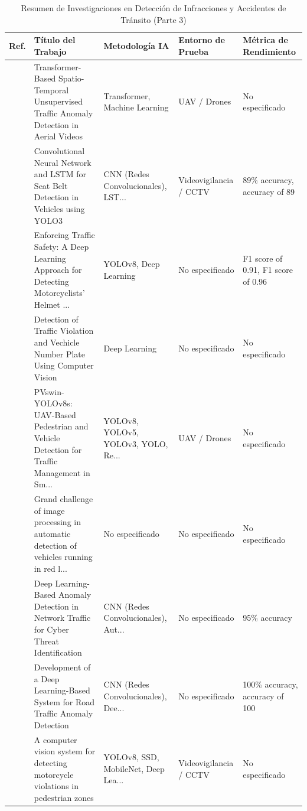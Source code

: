 \begin{table}[htbp]
\centering
\renewcommand{\arraystretch}{1.1}
\caption{Resumen de Investigaciones en Detección de Infracciones y Accidentes de Tránsito (Parte 3)}
\label{tab:articulos_transporte_3}
\footnotesize
\begin{tabular}{cp{7.5cm}p{2.8cm}p{2.8cm}p{2.8cm}}
\toprule
\textbf{Ref.} & \textbf{Título del Trabajo} & \textbf{Metodología IA} & \textbf{Entorno de Prueba} & \textbf{Métrica de Rendimiento} \\
\midrule
\cite{tran2024transformerbased} & Transformer-Based Spatio-Temporal Unsupervised Traffic Anomaly Detection in Aerial Videos & Transformer, Machine Learning & UAV / Drones & No especificado \\
\cite{udayanti2024convolutional} & Convolutional Neural Network and LSTM for Seat Belt Detection in Vehicles using YOLO3 & CNN (Redes Convolucionales), LST... & Videovigilancia / CCTV & 89\% accuracy, accuracy of 89 \\
\cite{shoman2024enforcing} & Enforcing Traffic Safety: A Deep Learning Approach for Detecting Motorcyclists' Helmet ... & YOLOv8, Deep Learning & No especificado & F1 score of 0.91, F1 score of 0.96 \\
\cite{h2024traffic} & Detection of Traffic Violation and Vechicle Number Plate Using Computer Vision & Deep Learning & No especificado & No especificado \\
\cite{tahir2024pvswinyolovs} & PVswin-YOLOv8s: UAV-Based Pedestrian and Vehicle Detection for Traffic Management in Sm... & YOLOv8, YOLOv5, YOLOv3, YOLO, Re... & UAV / Drones & No especificado \\
\cite{samonte2024grand} & Grand challenge of image processing in automatic detection of vehicles running in red l... & No especificado & No especificado & No especificado \\
\cite{khalaf2024deep} & Deep Learning-Based Anomaly Detection in Network Traffic for Cyber Threat Identification & CNN (Redes Convolucionales), Aut... & No especificado & 95\% accuracy \\
\cite{ogundokun2024development} & Development of a Deep Learning-Based System for Road Traffic Anomaly Detection & CNN (Redes Convolucionales), Dee... & No especificado & 100\% accuracy, accuracy of 100 \\
\cite{hernndezdaz2024computer} & A computer vision system for detecting motorcycle violations in pedestrian zones & YOLOv8, SSD, MobileNet, Deep Lea... & Videovigilancia / CCTV & No especificado \\

\end{tabular}
\end{table}
